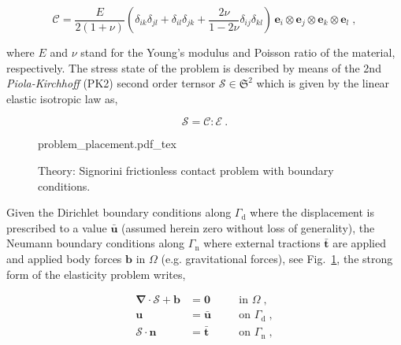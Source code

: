 \documentclass[10pt,a4paper]{article}
\begin{document}
\begin{equation}
	\boldsymbol{\mathcal{C}} = \frac{E}{2 (1 + \nu)} \left( \delta_{ik} \delta_{jl} + \delta_{il} \delta_{jk} + \frac{2 \nu}{1 - 2 \nu} \delta_{ij} \delta_{kl} \right) \, \mathbf{e}_i \otimes \mathbf{e}_j \otimes \mathbf{e}_k \otimes \mathbf{e}_l \;, \label{eq:material_tensor}
\end{equation}

where $E$ and $\nu$ stand for the Young's modulus and Poisson ratio of the material, respectively. The stress state of the problem is described by means of the 2nd \textit{Piola-Kirchhoff} (PK2) second order ternsor $\boldsymbol{\mathcal{S}} \in \mathfrak{S}^2$ which is given by the linear elastic isotropic law as,

\begin{equation}
	\boldsymbol{\mathcal{S}} = \boldsymbol{\mathcal{C}}  : \boldsymbol{\mathcal{E}} \:.
\end{equation}

\begin{figure}[!t]
	\centering
	\footnotesize
    \def\svgwidth{0.5\textwidth}{problem_placement.pdf_tex}
	\caption{Theory: Signorini frictionless contact problem with boundary conditions.}
	\label{im:signorini_contact_problem}
\end{figure}

Given the Dirichlet boundary conditions along $\Gamma_{\text{d}}$ where the displacement is prescribed to a value $\bar{\mathbf{u}}$ (assumed herein zero without loss of generality), the Neumann boundary conditions along $\Gamma_{\text{n}}$ where external tractions $\bar{\mathbf{t}}$ are applied and applied body forces $\mathbf{b}$ in $\Omega$ (e.g. gravitational forces), see Fig.~\ref{im:signorini_contact_problem}, the strong form of the elasticity problem writes,

\begin{subequations}
	\begin{alignat}{2}
		\boldsymbol{\nabla} \cdot \boldsymbol{\mathcal{S}} + \mathbf{b} &= \mathbf{0} \quad &&\text{in } \Omega \;, \label{eq:strong_equilibrium} \\
		\mathbf{u} &= \bar{\mathbf{u}} &&\text{on } \Gamma_{\text{d}} \;, \label{eq:prescribed_displacement} \\
		\boldsymbol{\mathcal{S}} \cdot \mathbf{n} &= \bar{\mathbf{t}} &&\text{on } \Gamma_{\text{n}} \;,
	\end{alignat}
	\label{eq:strong_formulation}
\end{subequations}
\end{document}

